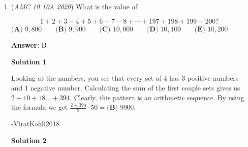 \begin{enumerate}
 1. The sum of all squares is 50:

 
 \[a + b + c = 50\]

 
2. The sum of all 12 lines counts each square multiple times based on its position:

 
 \[12S = 4a + 3b + 2c\]

 


 This means $4a + 3b + 2c \equiv 0 \pmod{12}$.

 We just need to find a combination of $a$, $b$, and $c$ such that $a + b + c$ is a factor of 50, and then scale it up.A simple combination that works is $a=0$, $b=2$, and $c=3$. The sum here is $0 + 2 + 3 = 5$.Since we need the sum to be 50, we can multiply our combination by 10 to get $a=0$, $b=20$, and $c=30$. (Note: $0 + 20 + 30 = 50$, satisfying our first equation).

 Now, plug this combination back into our line sum equation:

 

 \[12S = 4(0) + 3(20) + 2(30)\]

 \[12S = 0 + 60 + 60\]

 \[12S = 120\]

 \[S = 10\]

 The common sum is thus $\boxed{\textbf{(C) } 10}$.

 -PandaGod7

 Education, the Study of Everything

 


	\item (\textit{AMC 10 10A 2020}) What is the value of


 
 \[1+2+3-4+5+6+7-8+\cdots+197+198+199-200?\]
$\textbf{(A) } 9,800 \qquad \textbf{(B) } 9,900 \qquad \textbf{(C) } 10,000 \qquad \textbf{(D) } 10,100 \qquad \textbf{(E) } 10,200$

 \textbf{Answer: }B



\textbf{Solution 1}

Looking at the numbers, you see that every set of $4$ has $3$ positive numbers and 1 negative number. Calculating the sum of the first couple sets gives us $2+10+18...+394$. Clearly, this pattern is an arithmetic sequence. By using the formula we get $\frac{2+394}{2}\cdot 50=\boxed{\textbf{(B) }9900}$.

 -ViratKohli2018

 



\textbf{Solution 2}


\end{enumerate}
